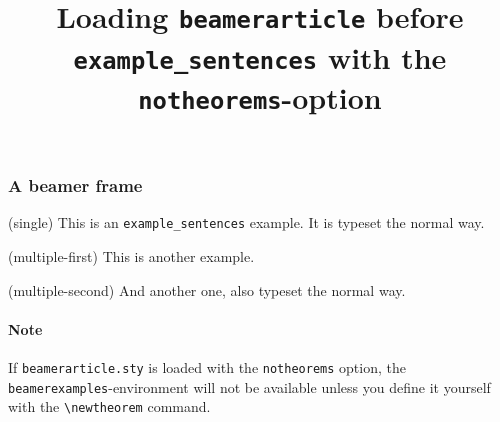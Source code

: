 \documentclass{article}
\title{Loading \texttt{beamerarticle} before \texttt{example\_sentences} with the \texttt{notheorems}-option}
\date{}
\author{}
\begin{document}
	\maketitle
	\begin{frame}
		\frametitle{A beamer frame}
		\begin{examples}
			\item(single) This is an \texttt{example\_sentences} example. It is typeset the normal way.
		\end{examples}
		\begin{examples}
		 	 \item(multiple-first) This is another example.
		 	 \item(multiple-second) And another one, also typeset the normal way.
		\end{examples}
	\end{frame}
    
    \paragraph{Note} If \texttt{beamerarticle.sty} is loaded with the \texttt{notheorems} option, the \texttt{beamerexamples}-environment will not be available unless you define it yourself with the
    \verb|\newtheorem| command.
\end{document}
